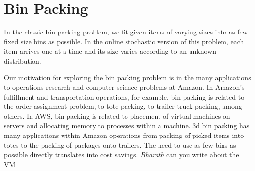 \documentclass{article}
\begin{document}
\section{Bin Packing}
\label{binpacking}

In the classic bin packing problem, we fit given items of varying sizes into as few fixed size bins as possible. In the online stochastic version of this problem, each item arrives one at a time and its size varies according to an unknown distribution. 

Our motivation for exploring the bin packing problem is in the many applications to operations research and computer science problems at Amazon. 
In Amazon's fulfillment and transportation operations, for example, bin packing is related to the order assignment problem, to tote packing, to trailer truck packing, among others.  
In AWS, bin packing is related to placement of virtual machines on servers and allocating memory to processes within a machine. 
\ifx 3d bin packing has many applications within Amazon operations from packing of picked items into totes to the packing of packages onto trailers. The need to use as few bins as possible directly translates into cost savings. \emph{Bharath} can you write about the VM
\fi
\end{document}
